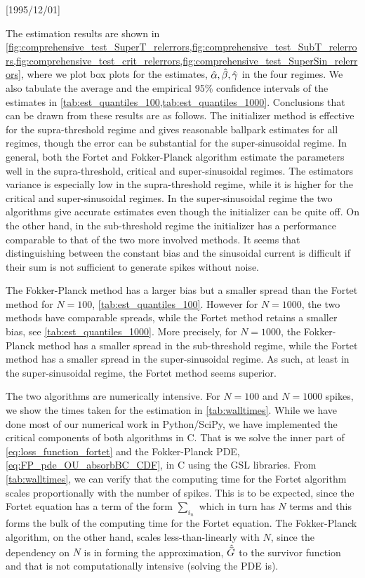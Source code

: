\NeedsTeXFormat{LaTeX2e}[1995/12/01] \documentclass[10pt]{bmc_article}
\newenvironment{bmcformat}{\begin{raggedright}\baselineskip20pt\sloppy\setboolean{publ}{false}}{\end{raggedright}\baselineskip20pt\sloppy}
\begin{document}
\begin{bmcformat}
The estimation results are shown in
\cref{fig:comprehensive_test_SuperT_relerrors,fig:comprehensive_test_SubT_relerrors,fig:comprehensive_test_crit_relerrors,fig:comprehensive_test_SuperSin_relerrors},
where we plot box plots for the estimates, ${{{ \hat{{\alpha}} }, { \hat{{\beta}} }, { \hat{{\gamma }} }} }$ in the four regimes. We
also tabulate the average and the empirical 95\% confidence intervals of the
estimates in \cref{tab:est_quantiles_100,tab:est_quantiles_1000}. Conclusions
that can be drawn from these results are as follows. The initializer method is
effective for the supra-threshold regime and gives reasonable ballpark estimates
for all regimes, though the error can be substantial for the super-sinusoidal
regime. In general, both the Fortet and Fokker-Planck algorithm estimate the
parameters well in the supra-threshold, critical and super-sinusoidal regimes.
The estimators variance is especially low in the supra-threshold regime, while
it is higher for the critical and super-sinusoidal regimes. In the
super-sinusoidal regime the two algorithms give accurate estimates even though
the initializer can be quite off. On the other hand, in the sub-threshold regime
the initializer has a performance comparable to that of the two more involved
methods. It seems that distinguishing between the constant bias and the
sinusoidal current is difficult if their sum is not sufficient to generate
spikes without noise.


The Fokker-Planck method has a larger bias but a smaller spread than the Fortet
method for $N=100$, \cref{tab:est_quantiles_100}. However for
$N=1000$, the two methods have comparable 
spreads, while the Fortet method retains a smaller bias, see
\cref{tab:est_quantiles_1000}. More precisely, for $N=1000$, the Fokker-Planck
method has a smaller spread in the sub-threshold regime, while the Fortet method
has a smaller spread in the super-sinusoidal regime. As such, at least in the
super-sinusoidal regime, the Fortet method seems superior.

The two algorithms are numerically intensive. For $N=100$ and $N=1000$ spikes,
we show the times taken for the estimation in \cref{tab:walltimes}. While we
have done most of our numerical work in Python/SciPy\cite{scipy}, we have
implemented the critical components of both algorithms in C. That is we solve
the inner part of \cref{eq:loss_function_fortet} and the Fokker-Planck PDE,
\cref{eq:FP_pde_OU_absorbBC_CDF}, in C using the GSL libraries\cite{gsl}. From
\cref{tab:walltimes}, we can verify that the computing time for the Fortet
algorithm scales proportionally with the number of spikes. This is to be
expected, since the Fortet equation has a term of the form $\sum_{i_n}$ which in
turn has $N$ terms and this forms the bulk of the computing time for the
Fortet equation. The Fokker-Planck algorithm, on the other hand, scales
less-than-linearly with $N$, since the dependency on $N$ is in forming the
approximation, ${ \hat{{ \bar{G} }} }$ to the survivor function and that is not computationally
intensive (solving the PDE is).




\end{bmcformat}
\end{document}
